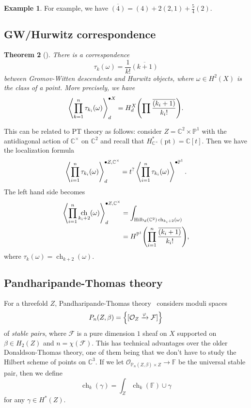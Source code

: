 \documentclass[leqno, openany]{memoir}
\newtheorem{thm}{Theorem}[section]
\theoremstyle{definition}
\newtheorem{exm}[thm]{Example}
\theoremstyle{remark}
\theoremstyle{plain}
\theoremstyle{definition}
\theoremstyle{remark}
\newcommand{\F}{\mathbb{F}}
\newcommand{\C}{\mathbb{C}}
\renewcommand{\P}{\mathbb{P}}
\newcommand{\mc}[1]{\mathcal{#1}}
\newcommand{\mr}[1]{\mathrm{#1}}
\newcommand{\ol}[1]{\overline{#1}}
\DeclareMathOperator{\ch}{ch}
\begin{document}
\begin{exm}
    For example, we have $\overline{(4)} = (4) + 2(2,1) + \frac{5}{4} (2)$.
\end{exm}

\subsection{GW/Hurwitz correspondence}

\begin{thm}[{\cite{op1}}]\label{thm:op01}
    There is a correspondence
    \[ \tau_k(\omega) = \frac{1}{k!} \ol{(k+1)} \]
    between Gromov-Witten descendents and Hurwitz objects, where $\omega \in H^2(X)$ is the class of a point. More precisely, we have
    \[ \ev{\prod_{k=1}^n \tau_{k_i}(\omega)}_d^{\bullet X} = H_d^X \qty(\prod \frac{\ol{(k_i+1)}}{k_i!}). \]
\end{thm}

This can be related to PT theory as follows: consider $Z = \C^2 \times \P^1$ with the antidiagonal action of $\C^{\times}$ on $\C^2$ and recall that $H_{\C^{\times}}^*(\mr{pt}) = \C[t]$. Then we have the localization formula
\[ \ev{\prod_{i=1}^n \tau_{k_i}(\omega)}_d^{\bullet Z, \C^{\times}} = t^? \ev{\prod_{i=1}^n \tau_{k_i}(\omega)}^{\bullet \P^1}. \]
The left hand side becomes
\begin{align*}
    \ev{\prod_{i=1}^n \ch_{k_i+2}(\omega)}^{\bullet Z, \C^{\times}}_d &= \int_{\mr{Hilb}_d(\C^2) \ch_{k_i+2}(\omega)} \\
    &= H^{\P^1} \qty(\prod_{i=1}^n \frac{\ol{(k_i+1)}}{k_i!}),
\end{align*}
where $\tau_k(\omega) = \ch_{k+2}(\omega)$.

\subsection{Pandharipande-Thomas theory}\label{sub:pt}

For a threefold $Z$, Pandharipande-Thomas theory~\cite{ptthy} considers moduli spaces
\[ P_n(Z, \beta) = \qty{[\mc{O}_Z \xrightarrow{\varphi} \mc{F}]} \]
of \textit{stable pairs}, where $\mc{F}$ is a pure dimension $1$ sheaf on $X$ supported on $\beta \in H_2(Z)$ and $n = \chi(\mc{F})$. This has technical advantages over the older Donaldson-Thomas theory, one of them being that we don't have to study the Hilbert scheme of points on $\C^3$. If we let $\mc{O}_{\P_n(Z, \beta) \times Z} \to \F$ be the universal stable pair, then we define
\[ \ch_k(\gamma) = \int_Z \ch_k(\F) \cup \gamma \] for any $\gamma \in H^*(Z)$.
\end{document}
